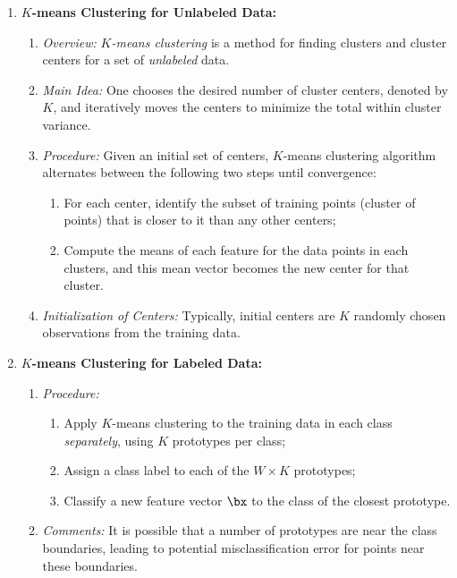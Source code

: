 \documentclass[12pt]{article}
\begin{document}
\begin{enumerate}[label=\textbf{\arabic*.}]
	\item \textbf{$K$-means Clustering for Unlabeled Data:} 
	\begin{enumerate}
		\item \textit{Overview:} \textit{$K$-means clustering} is a method for finding clusters and cluster centers for a set of \emph{unlabeled} data. 
		\item \textit{Main Idea:} One chooses the desired number of cluster centers, denoted by $K$, and iteratively moves the centers to minimize the total within cluster variance. 
		\item \textit{Procedure:} Given an initial set of centers, $K$-means clustering algorithm alternates between the following two steps until convergence: 
		\begin{enumerate}
			\item For each center, identify the subset of training points (cluster of points) that is closer to it than any other centers; 
			\item Compute the means of each feature for the data points in each clusters, and this mean vector becomes the new center for that cluster. 
		\end{enumerate}
		
		\item \textit{Initialization of Centers:} Typically, initial centers are $K$ randomly chosen observations from the training data. 
	\end{enumerate}
	
	\item \textbf{$K$-means Clustering for Labeled Data:} 
	\begin{enumerate}
		\item \textit{Procedure:} 
		\begin{enumerate}
			\item Apply $K$-means clustering to the training data in each class \textit{separately}, using $K$ prototypes per class; 
			\item Assign a class label to each of the $W \times K$ prototypes; 
			\item Classify a new feature vector $\bx$ to the class of the closest prototype. 
		\end{enumerate}
		
		\item \textit{Comments:} It is possible that a number of prototypes are near the class boundaries, leading to potential misclassification error for points near these boundaries. 
	\end{enumerate}
	

\end{enumerate}
\end{document}
